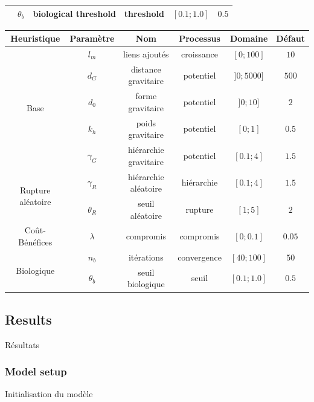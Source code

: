 \begin{table}
{\begin{tabular}{|c|c|c|c|c|c|}
& $\theta_b$ & biological threshold & threshold & $[0.1;1.0]$ & $0.5$ \\\hline
\end{tabular}
}{
\begin{tabular}{|c|c|c|c|c|c|}
  \hline
Heuristique & Paramètre & Nom & Processus & Domaine & Défaut\\
  \hline
\multirow{5}{*}{Base}& $l_m$ & liens ajoutés & croissance & $[0;100]$ & $10$ \\\cline{2-6}
 & $d_G$ & distance gravitaire & potentiel & $]0;5000]$ & $500$ \\\cline{2-6}
 & $d_0$ & forme gravitaire & potentiel & $]0;10]$ & $2$ \\\cline{2-6}
 & $k_h$ & poids gravitaire & potentiel & $[0;1]$ & $0.5$ \\\cline{2-6}
 & $\gamma_G$ & hiérarchie gravitaire & potentiel & $[0.1;4]$ & $1.5$ \\\hline
\multirow{2}{*}{Rupture aléatoire}& $\gamma_R$ & hiérarchie aléatoire & hiérarchie & $[0.1;4]$ & $1.5$ \\\cline{2-6}
& $\theta_R$ & seuil aléatoire & rupture & $[1;5]$ & $2$ \\\hline
Coût-Bénéfices& $\lambda$ & compromis & compromis & $[0;0.1]$ & $0.05$ \\\hline
\multirow{2}{*}{Biologique}& $n_b$ & itérations & convergence & $[40;100]$ & $50$ \\\cline{2-6}
& $\theta_b$ & seuil biologique & seuil & $[0.1;1.0]$ & $0.5$ \\\hline
\end{tabular}
}
\end{table}






\subsection{Results}{Résultats}


\subsubsection{Model setup}{Initialisation du modèle}

